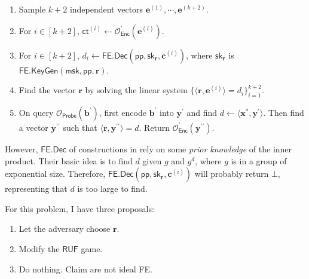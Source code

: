 \begin{enumerate}

\item Sample $k+2$ independent vectors $\mathbf{e}^{(1)}, \cdots, \mathbf{e}^{(k+2)}$.

\item For $i \in [k+2]$, $\textsf{ct}^{(i)} \gets \mathcal{O}^\prime_{\textsf{Enc}}(\mathbf{e}^{(i)})$.

\item For $i \in [k+2]$,  $d_i \gets \textsf{FE.Dec}(\textsf{pp}, \textsf{sk}_{\mathbf{r}}, \mathbf{c}^{(i)})$, where $\textsf{sk}_{\mathbf{r}}$ is $\textsf{FE.KeyGen}(\textsf{msk}, \textsf{pp}, \mathbf{r})$.

\item Find the vector $\mathbf{r}$ by solving the linear system $\{ \langle \mathbf{r}, {\mathbf{e}^{(i)}} \rangle = d_i \}_{i=1}^{k+2}$.

\item On query $\mathcal{O}_{\textsf{Probe}}(\mathbf{b}^\prime)$, first encode $\mathbf{b}^\prime$ into $\mathbf{y}^\prime$ and find $d \gets \langle \mathbf{x}^{*}, {\mathbf{y}^\prime} \rangle$. Then find a vector $\mathbf{y}^{\prime\prime}$ such that $ \langle \mathbf{r}, {\mathbf{y}^{\prime\prime}} \rangle = d$. Return $\mathcal{O}^\prime_{\textsf{Enc}}(\mathbf{y}^{\prime\prime})$.

\end{enumerate}

However, $\textsf{FE.Dec}$ of constructions in \cite{cryptoeprint:2015/1255, 10.1007/978-3-319-45871-7_24, cryptoeprint:2016/440} rely on some \emph{prior knowledge} of the inner product. Their basic idea is to find $d$ given $g$ and $g^d$, where $g$ is in a group of exponential size. Therefore, $\textsf{FE.Dec}(\textsf{pp}, \textsf{sk}_{\mathbf{r}}, \mathbf{c}^{(i)})$ will probably return $\bot$, representing that $d$ is too large to find.

For this problem, I have three proposals:
\begin{enumerate}
	\item Let the adversary choose $\mathbf{r}$.

	\item Modify the $\textsf{RUF}$ game. 

	\item Do nothing. Claim \cite{cryptoeprint:2015/1255, 10.1007/978-3-319-45871-7_24, cryptoeprint:2016/440} are not ideal \textsf{FE}.
\end{enumerate}

